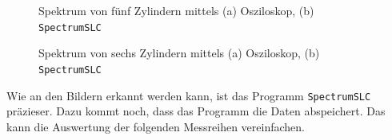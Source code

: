 \begin{figure}
    \caption{Spektrum von fünf Zylindern mittels (a) Osziloskop, (b) \texttt{SpectrumSLC}}
\end{figure}
\begin{figure}
    \caption{Spektrum von sechs Zylindern mittels (a) Osziloskop, (b) \texttt{SpectrumSLC}}
\end{figure}
\FloatBarrier
Wie an den Bildern erkannt werden kann, ist das Programm \texttt{SpectrumSLC} präzieser. Dazu kommt noch, dass das Programm die 
Daten abspeichert. Das kann die Auswertung der folgenden Messreihen vereinfachen.


